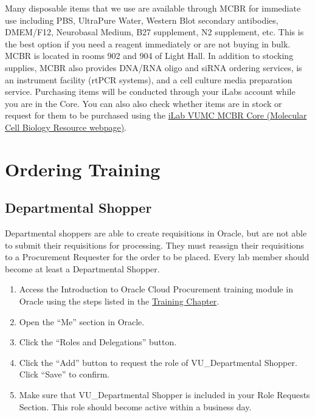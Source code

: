 \documentclass[
]{book}
\begin{document}
Many disposable items that we use are available through MCBR for immediate use including PBS, UltraPure Water, Western Blot secondary antibodies, DMEM/F12, Neurobasal Medium, B27 supplement, N2 supplement, etc. This is the best option if you need a reagent immediately or are not buying in bulk. MCBR is located in rooms 902 and 904 of Light Hall. In addition to stocking supplies, MCBR also provides DNA/RNA oligo and siRNA ordering services, is an instrument facility (rtPCR systems), and a cell culture media preparation service. Purchasing items will be conducted through your iLabs account while you are in the Core. You can also also check whether items are in stock or request for them to be purchased using the \href{https://vanderbilt.corefacilities.org/sc/4722/vumc-mcbr-core-molecular-cell-biology-resource/?tab=services}{iLab VUMC MCBR Core (Molecular Cell Biology Resource webpage)}.

\hypertarget{ordering-training}{%
\section{Ordering Training}\label{ordering-training}}

\hypertarget{departmental-shopper}{%
\subsection{Departmental Shopper}\label{departmental-shopper}}

Departmental shoppers are able to create requisitions in Oracle, but are not able to submit their requisitions for processing. They must reassign their requisitions to a Procurement Requester for the order to be placed. Every lab member should become at least a Departmental Shopper.

\begin{enumerate}
\def\labelenumi{\arabic{enumi}.}
\item
  Access the Introduction to Oracle Cloud Procurement training module in Oracle using the steps listed in the \protect\hyperlink{training}{Training Chapter}.
\item
  Open the ``Me'' section in Oracle.
\item
  Click the ``Roles and Delegations'' button.
\item
  Click the ``Add'' button to request the role of VU\_Departmental Shopper. Click ``Save'' to confirm.
\item
  Make sure that VU\_Departmental Shopper is included in your Role Requests Section. This role should become active within a business day.
\end{enumerate}
\end{document}
